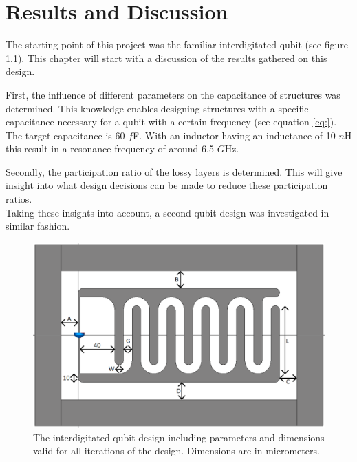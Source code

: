 \chapter{Results and Discussion}
The starting point of this project was the familiar interdigitated qubit (see figure \ref{fig:Yale_parameters2}). This chapter will start with a discussion of the results gathered on this design.


First, the influence of different parameters on the capacitance of structures was determined. This knowledge enables designing structures with a specific capacitance necessary for a qubit with a certain frequency (see equation \eqref{eq:}). The target capacitance is 60 \(f\)F. With an inductor having an inductance of 10 \(n\)H this result in a resonance frequency of around 6.5 \(G\)Hz.


Secondly, the participation ratio of the lossy layers is determined. This will give insight into what design decisions can be made to reduce these participation ratios.\\
Taking these insights into account, a second qubit design was investigated in similar fashion. 

\vfill

\begin{figure}[h]
	\centering
	\includegraphics[scale = .4]{Figures/Yale_parameters2_cropped}
	\caption{The interdigitated qubit design including parameters and dimensions valid for all iterations of the design. Dimensions are in micrometers.}
	\label{fig:Yale_parameters2}
\end{figure}

